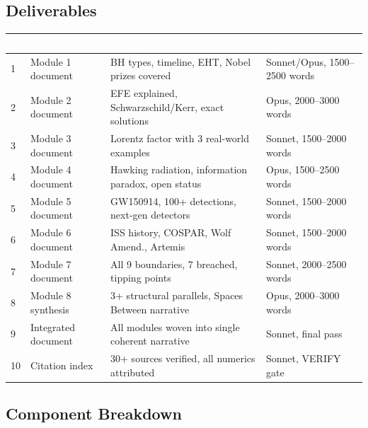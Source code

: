 \documentclass[11pt,letterpaper]{article}
\newcommand{\tableheader}[1]{\textbf{\sffamily\textcolor{white}{#1}}}
\begin{document}
\subsection{Deliverables}

\begin{center}
\begin{tabularx}{\textwidth}{C{0.5cm}L{3.5cm}L{4cm}L{4.5cm}}
\toprule
{}
\tableheader{\#} & \tableheader{Deliverable} & \tableheader{Acceptance Criteria} & \tableheader{Spec} \\
 & Module 1 document & BH types, timeline, EHT, Nobel prizes covered & Sonnet/Opus, 1500--2500 words \\
2 & Module 2 document & EFE explained, Schwarzschild/Kerr, exact solutions & Opus, 2000--3000 words \\
3 & Module 3 document & Lorentz factor with 3 real-world examples & Sonnet, 1500--2000 words \\
4 & Module 4 document & Hawking radiation, information paradox, open status & Opus, 1500--2500 words \\
5 & Module 5 document & GW150914, 100+ detections, next-gen detectors & Sonnet, 1500--2000 words \\
6 & Module 6 document & ISS history, COSPAR, Wolf Amend., Artemis & Sonnet, 1500--2000 words \\
7 & Module 7 document & All 9 boundaries, 7 breached, tipping points & Sonnet, 2000--2500 words \\
8 & Module 8 synthesis & 3+ structural parallels, Spaces Between narrative & Opus, 2000--3000 words \\
9 & Integrated document & All modules woven into single coherent narrative & Sonnet, final pass \\
10 & Citation index & 30+ sources verified, all numerics attributed & Sonnet, VERIFY gate \\
\bottomrule
\end{tabularx}
\end{center}

\subsection{Component Breakdown}
\end{document}
